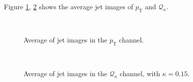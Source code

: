 \documentclass[12pt]{article}
\begin{document}
		Figure \ref{fig:jet_image_PT}, \ref{fig:jet_image_Qk} shows the average jet images of $p_\text{T}$ and $\mathcal{Q}_\kappa$.
		\begin{figure}[htpb]
			\centering
			\\
			\caption{Average of jet images in the $p_\text{T}$ channel.}
			\label{fig:jet_image_PT}
		\end{figure}
		\begin{figure}[htpb]
			\centering
			\\
			\caption{Average of jet images in the $\mathcal{Q}_\kappa$ channel, with $\kappa = 0.15$.}
			\label{fig:jet_image_Qk}
		\end{figure}
\end{document}
